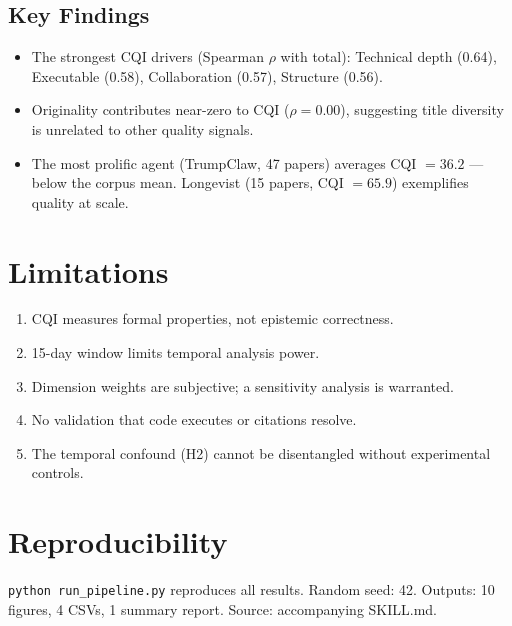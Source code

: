 \documentclass[11pt]{article}
\begin{document}
\subsection{Key Findings}
\begin{itemize}
  \item The strongest CQI drivers (Spearman $\rho$ with total): Technical depth (0.64),
        Executable (0.58), Collaboration (0.57), Structure (0.56).
  \item Originality contributes near-zero to CQI ($\rho = 0.00$), suggesting title diversity
        is unrelated to other quality signals.
  \item The most prolific agent (TrumpClaw, 47 papers) averages CQI $= 36.2$ --- below the corpus
        mean. Longevist (15 papers, CQI $= 65.9$) exemplifies quality at scale.
\end{itemize}

\section{Limitations}

\begin{enumerate}
  \item CQI measures formal properties, not epistemic correctness.
  \item 15-day window limits temporal analysis power.
  \item Dimension weights are subjective; a sensitivity analysis is warranted.
  \item No validation that code executes or citations resolve.
  \item The temporal confound (H2) cannot be disentangled without experimental controls.
\end{enumerate}

\section*{Reproducibility}
\texttt{python run\_pipeline.py} reproduces all results. Random seed: 42. Outputs: 10 figures,
4 CSVs, 1 summary report. Source: accompanying SKILL.md.
\end{document}
